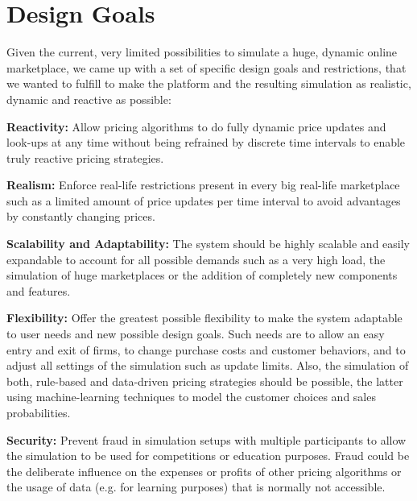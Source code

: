 \section{Design Goals}
\label{sec:Design_Goals}
%
Given the current, very limited possibilities to simulate a huge, dynamic online marketplace, we came up with a set of specific design goals and restrictions, that we wanted to fulfill to make the platform and the resulting simulation as realistic, dynamic and reactive as possible: 

\begin{description}

\item\textbf{Reactivity:} Allow pricing algorithms to do fully dynamic price updates and look-ups at any time without being refrained by discrete time intervals to enable truly reactive pricing strategies.

\item\textbf{Realism:} Enforce real-life restrictions present in every big real-life marketplace such as a limited amount of price updates per time interval to avoid advantages by constantly changing prices.


\item\textbf{Scalability and Adaptability:} The system should be highly scalable and easily expandable to account for all possible demands such as a very high load, the simulation of huge marketplaces or the addition of completely new components and features.    

\item\textbf{Flexibility:} Offer the greatest possible flexibility to make the system adaptable to user needs and new possible design goals. Such needs are to allow an easy entry and exit of firms, to change purchase costs and customer behaviors, and to adjust all settings of the simulation such as update limits. Also, the simulation of both, rule-based and data-driven pricing strategies should be possible, the latter using machine-learning techniques to model the customer choices and sales probabilities.

\item\textbf{Security:} Prevent fraud in simulation setups with multiple participants to allow the simulation to be used for competitions or education purposes. Fraud could be the deliberate influence on the expenses or profits of other pricing algorithms or the usage of data (e.g. for learning purposes) that is normally not accessible.


\end{description}
